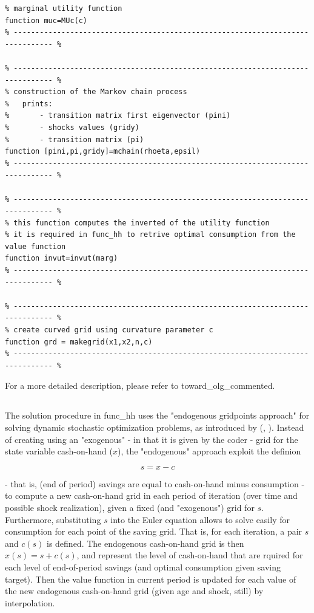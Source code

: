 \documentclass[12pt,a4paper]{article}
\begin{document}
\pagebreak
\begin{lstlisting}[frame=single]
% ------------------------------------------------------------------------------- %
% marginal utility function
function muc=MUc(c)
% ------------------------------------------------------------------------------- %

% ------------------------------------------------------------------------------- %
% construction of the Markov chain process
%   prints:
%       - transition matrix first eigenvector (pini)
%       - shocks values (gridy)
%       - transition matrix (pi)
function [pini,pi,gridy]=mchain(rhoeta,epsil)
% ------------------------------------------------------------------------------- %

% ------------------------------------------------------------------------------- %
% this function computes the inverted of the utility function
% it is required in func_hh to retrive optimal consumption from the value function
function invut=invut(marg)
% ------------------------------------------------------------------------------- %

% ------------------------------------------------------------------------------- %
% create curved grid using curvature parameter c
function grd = makegrid(x1,x2,n,c)
% ------------------------------------------------------------------------------- %
\end{lstlisting}

For a more detailed description, please refer to {\selectfont toward\_olg\_commented}.

\subsection{}

The solution procedure in {\selectfont func\_hh} uses the "endogenous gridpoints approach" for solving dynamic stochastic optimization problems, as introduced by \citeauthor{carroll2002lecture} (\citeyear{carroll2002lecture}, \citeyear{carroll2006method}). Instead of creating using an "exogenous" - in that it is given by the coder - grid for the state variable cash-on-hand ($x$), the "endogenous" approach exploit the definion

$$ s = x - c $$

- that is, (end of period) savings are equal to cash-on-hand minus consumption - to compute a new cash-on-hand grid in each period of iteration (over time and possible shock realization), given a fixed (and "exogenous") grid for $s$. Furthermore, substituting $s$ into the Euler equation allows to solve easily for consumption for each point of the saving grid. That is, for each iteration, a pair $s$ and $c(s)$ is defined. The endogenous cash-on-hand grid is then $x(s) = s + c(s)$, and represent the level of cash-on-hand that are rquired for each level of end-of-period savings (and optimal consumption given saving target). Then the value function in current period is updated for each value of the new endogenous cash-on-hand grid (given age and shock, still) by interpolation.
\end{document}
